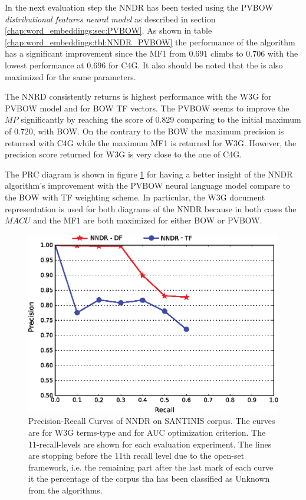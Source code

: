 In the next evaluation step the NNDR has been tested using the PVBOW \textit{distributional features neural model }as described in section \ref{chap:word_embeddings:sec:PVBOW}. As shown in table \ref{chap:word_embeddings:tbl:NNDR_PVBOW} the performance of the algorithm has a significant improvement since the  MF1 from $0.691$ climbs to $0.706$ with the lowest performance at $0.696$ for C4G. It also should be noted that the is also maximized for the same parameters. 

The NNRD consistently returns is highest performance with the W3G for PVBOW model and for BOW TF vectors. The PVBOW seems to improve the $MP$ significantly by reaching the score of $0.829$ comparing to the initial maximum of $0.720$, with BOW. On the contrary to the BOW the maximum precision is returned with C4G while the maximum MF1 is returned for W3G. However, the precision score returned for W3G is very close to the one of C4G.

The PRC diagram is shown in figure  \ref{chap:word_embeddings:fig:NNDR_W3G} for having a better insight of the NNDR algorithm's improvement with the PVBOW neural language model compare to the BOW with TF weighting scheme. In particular, the W3G document representation is used for both diagrams of the NNDR because in both cases the $MACU$ and the MF1 are both maximized for either BOW or PVBOW.

\begin{figure}[H]

\begin{center}
\includegraphics[scale=0.99]{Figures/NNDR_W3G.eps}
\caption{Precision-Recall Curves of NNDR on SANTINIS corpus. The curves are for W3G terms-type and for AUC optimization criterion. The 11-recall-levels are shown for each evaluation experiment. The lines are stopping before the 11th recall level due to the open-set framework, i.e. the remaining part after the last mark of each curve it the percentage of the corpus tha has been classified as Unknown from the algorithms.}
\label{chap:word_embeddings:fig:NNDR_W3G}
\end{center}

\end{figure}

